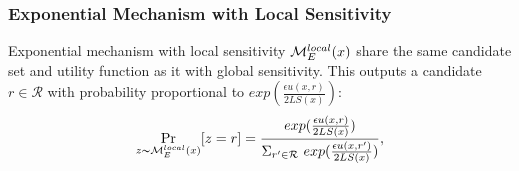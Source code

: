 \documentclass[sigconf]{acmart}
\begin{document}



\subsubsection{Exponential Mechanism with Local Sensitivity}
\label{subsec_emls}
Exponential mechanism with local sensitivity $\mathcal{M}_E^{local}({x})$ share the same candidate set and utility function as it with global sensitivity. This outputs a candidate $r \in \mathcal{R}$ with probability proportional to $exp(\frac{\epsilon u(x,r)}{2 LS(x)})$:
\begin{equation*}
\underset{z \thicksim \mathcal{M}_E^{local}({x})}{\Pr}[z=r] = \frac
{exp(\frac{\epsilon u(x,r)}{2 LS(x)})}
{\Sigma_{r' \in \mathcal{R}}\ exp(\frac{\epsilon u(x,r')}{2 LS(x)})},
\end{equation*}
\end{document}

